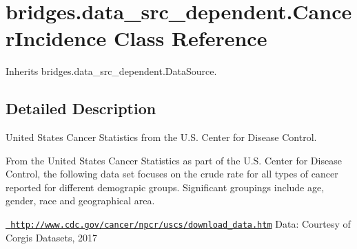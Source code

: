 \hypertarget{classbridges_1_1data__src__dependent_1_1_cancer_incidence}{}\section{bridges.\+data\+\_\+src\+\_\+dependent.\+Cancer\+Incidence Class Reference}
\label{classbridges_1_1data__src__dependent_1_1_cancer_incidence}


Inherits bridges.\+data\+\_\+src\+\_\+dependent.\+Data\+Source.



\subsection{Detailed Description}
United States Cancer Statistics from the U.\+S. Center for Disease Control. 

From the United States Cancer Statistics as part of the U.\+S. Center for Disease Control, the following data set focuses on the crude rate for all types of cancer reported for different demograpic groups. Significant groupings include age, gender, race and geographical area.

\href{http://www.cdc.gov/cancer/npcr/uscs/download_data.htm}{\texttt{ http\+://www.\+cdc.\+gov/cancer/npcr/uscs/download\+\_\+data.\+htm}} Data\+: Courtesy of Corgis Datasets, 2017

